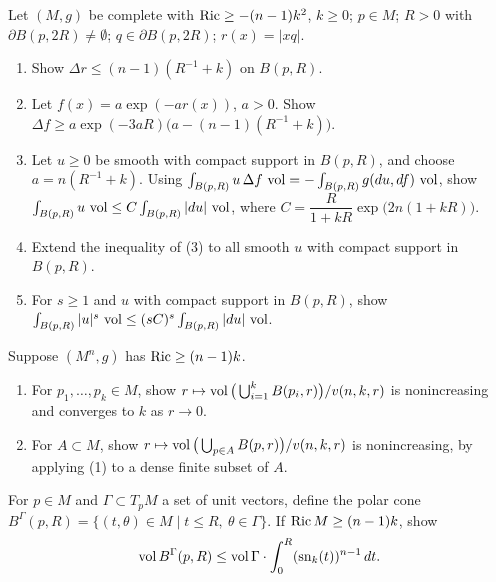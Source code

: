 \begin{remark}
  \label{rem:pet-ch7-ex-17}
  Let $(M,g)$ be complete with $\operatorname{Ric}\ge-(n-1)k^2$, $k\ge0$; $p\in M$; $R>0$
  with $\partial B(p,2R)\ne\emptyset$; $q\in\partial B(p,2R)$;
  $r(x)=|xq|$.
  \begin{enumerate}
    \item[(1)] Show $\Delta r\le(n-1)(R^{-1}+k)$ on $B(p,R)$.
    \item[(2)] Let $f(x)=a\exp(-ar(x))$, $a>0$. Show
      $\Delta f\ge a\exp(-3aR)\big(a-(n-1)(R^{-1}+k)\big)$.
    \item[(3)] Let $u\ge0$ be smooth with compact support in $B(p,R)$, and
      choose $a=n(R^{-1}+k)$. Using
      $\int_{B(p,R)}u\,\Delta f\,\operatorname{vol}=-\int_{B(p,R)}g(du,df)\,\operatorname{vol}$, show
      $\int_{B(p,R)}u\,\operatorname{vol}\le C\int_{B(p,R)}|du|\,\operatorname{vol}$, where
      $C=\dfrac{R}{1+kR}\exp\big(2n(1+kR)\big)$.
    \item[(4)] Extend the inequality of (3) to all smooth $u$ with compact
      support in $B(p,R)$.
    \item[(5)] For $s\ge1$ and $u$ with compact support in $B(p,R)$, show
      $\int_{B(p,R)}|u|^s\,\operatorname{vol}\le(sC)^s\int_{B(p,R)}|du|\,\operatorname{vol}$.
  \end{enumerate}
\end{remark}

\begin{remark}
  \label{rem:pet-ch7-ex-18}
  Suppose $(M^n,g)$ has $\operatorname{Ric}\ge(n-1)k$.
  \begin{enumerate}
    \item[(1)] For $p_1,\dots,p_k\in M$, show
      $r\mapsto\operatorname{vol}\big(\bigcup_{i=1}^kB(p_i,r)\big)/v(n,k,r)$ is
      nonincreasing and converges to $k$ as $r\to0$.
    \item[(2)] For $A\subset M$, show
      $r\mapsto\operatorname{vol}\big(\bigcup_{p\in A}B(p,r)\big)/v(n,k,r)$ is
      nonincreasing, by applying (1) to a dense finite subset of $A$.
  \end{enumerate}
\end{remark}

\begin{remark}
  \label{rem:pet-ch7-ex-19}
  For $p\in M$ and $\Gamma\subset T_pM$ a set of unit vectors, define the
  polar cone $B^\Gamma(p,R)=\{(t,\theta)\in M\mid t\le R,\ \theta\in\Gamma\}$.
  If $\operatorname{Ric} M\ge(n-1)k$, show
  \[
    \operatorname{vol} B^\Gamma(p,R)\le\operatorname{vol}\Gamma\cdot\int_0^R(\mathrm{sn}_k(t))^{n-1}\,dt.
  \]
\end{remark}

